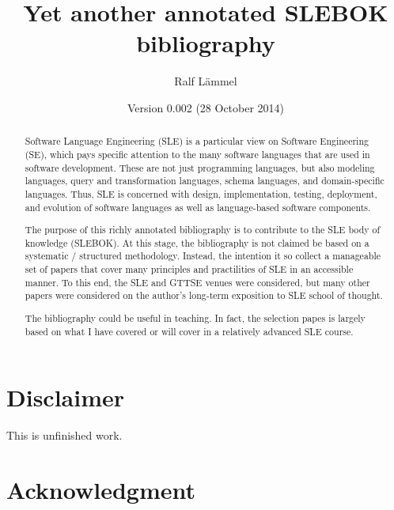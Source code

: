 \documentclass[12pt]{article}
\title{Yet another annotated SLEBOK bibliography}
\author{Ralf L\"ammel}
\date{Version 0.002 (28 October 2014)}
\begin{document}
\maketitle


\begin{abstract}

  Software Language Engineering (SLE) is a particular view on Software
  Engineering (SE), which pays specific attention to the many software
  languages that are used in software development.  These are not just
  programming languages, but also modeling languages, query and
  transformation languages, schema languages, and domain-specific
  languages. Thus, SLE is concerned with design, implementation,
  testing, deployment, and evolution of software languages as well as
  language-based software components.

  \medskip

  The purpose of this richly annotated bibliography is to contribute
  to the SLE body of knowledge (SLEBOK). At this stage, the
  bibliography is not claimed be based on a systematic / structured
  methodology. Instead, the intention it so collect a manageable set
  of papers that cover many principles and practilities of SLE in an
  accessible manner. To this end, the SLE and GTTSE venues were
  considered, but many other papers were considered on the author's
  long-term exposition to SLE school of thought. 

  \medskip 
  The bibliography could be useful in teaching. In fact, the selection
  papes is largely based on what I have covered or will cover in a
  relatively advanced SLE course.

\end{abstract}


\newpage

\tableofcontents


\newpage

\section{Disclaimer}

This is unfinished work.

\section{Acknowledgment}
\end{document}
